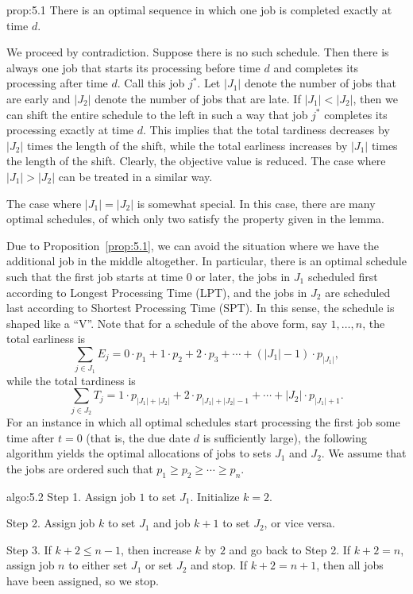 \begin{prop}{prop:5.1}
    There is an optimal sequence in which one job is completed exactly 
    at time $d$. 
\end{prop}
\begin{pf}
    We proceed by contradiction. Suppose there is no such schedule. Then
    there is always one job that starts its processing before time $d$ and 
    completes its processing after time $d$. Call this job $j^*$. 
    Let $|J_1|$ denote the number of jobs that are early and $|J_2|$ 
    denote the number of jobs that are late. If $|J_1| < |J_2|$, then we 
    can shift the entire schedule to the left in such a way that job $j^*$
    completes its processing exactly at time $d$. This implies that the 
    total tardiness decreases by $|J_2|$ times the length of the shift, 
    while the total earliness increases by $|J_1|$ times the length of 
    the shift. Clearly, the objective value is reduced. The case 
    where $|J_1| > |J_2|$ can be treated in a similar way. 

    The case where $|J_1| = |J_2|$ is somewhat special. In this case, there 
    are many optimal schedules, of which only two satisfy the property 
    given in the lemma. 
\end{pf}

Due to Proposition~\ref{prop:5.1}, we can avoid the situation where we have the 
additional job in the middle altogether. In particular, there is an optimal 
schedule such that the first job starts at time $0$ or later, the jobs in $J_1$ 
scheduled first according to Longest Processing Time (LPT), and the jobs in $J_2$
are scheduled last according to Shortest Processing Time (SPT). In this 
sense, the schedule is shaped like a ``V''. Note that for a schedule of the 
above form, say $1, \dots, n$, the total earliness is 
\[ \sum_{j\in J_1} E_j = 0 \cdot p_1 + 1 \cdot p_2 + 2 \cdot 
p_3 + \cdots + (|J_1| - 1) \cdot p_{|J_1|}, \] 
while the total tardiness is 
\[ \sum_{j\in J_2} T_j = 1 \cdot p_{|J_1|+|J_2|} + 2 \cdot 
p_{|J_1|+|J_2|-1} + \cdots + |J_2| \cdot p_{|J_1|+1}. \] 
For an instance in which all optimal schedules start processing the first job
some time after $t = 0$ (that is, the due date $d$ is sufficiently large), 
the following algorithm yields the optimal allocations of jobs to sets 
$J_1$ and $J_2$. We assume that the jobs are ordered such that $p_1 \geq 
p_2 \geq \cdots \geq p_n$. 

\begin{algo}{algo:5.2}
    {\sc Step 1.} Assign job $1$ to set $J_1$. Initialize $k = 2$. 

    {\sc Step 2.} Assign job $k$ to set $J_1$ and job $k+1$ to set $J_2$, 
    or vice versa. 

    {\sc Step 3.} If $k+2 \leq n-1$, then increase $k$ by $2$ and go back to 
    Step 2. If $k+2 = n$, assign job $n$ to either set $J_1$ or set $J_2$ 
    and stop. If $k+2 = n+1$, then all jobs have been assigned, so we stop. 
\end{algo}

